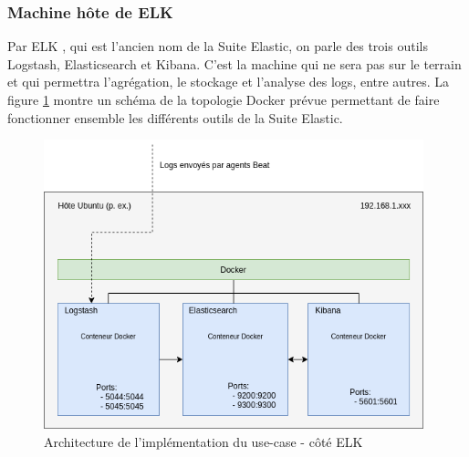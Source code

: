 \documentclass[paper=a4, fontsize=11pt]{scrartcl}
\begin{document}
\subsubsection{Machine hôte de \og ELK \fg}
Par \og ELK \fg, qui est l'ancien nom de la Suite Elastic, on parle des trois outils Logstash, Elasticsearch et Kibana. C'est la machine qui ne sera pas sur le terrain et qui permettra l'agrégation, le stockage et l'analyse des logs, entre autres.
La figure \ref{f-dockerTopology} montre un schéma de la topologie Docker prévue permettant de faire fonctionner ensemble les différents outils de la Suite Elastic.
\begin{figure}[H]
    \centering
    \includegraphics[width=11cm]{img/ElasticStack_docker_topology.png}
    \caption{Architecture de l'implémentation du use-case - côté \og ELK \fg}
    \label{f-dockerTopology}
\end{figure}
\end{document}

